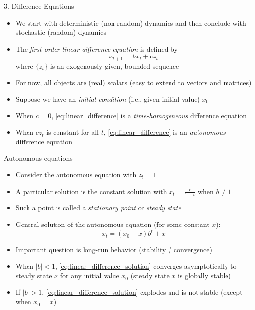\documentclass[10pt]{beamer}
\begin{document}
\begin{frame}{3. Difference Equations}
\begin{itemize}
\item We start with deterministic (non-random) dynamics and then conclude with stochastic (random) dynamics

\item The \textit{first-order linear difference equation} is defined by
\begin{equation}\label{eq:linear_difference}
	x_{t+1} = b x_t + c z_t 
\end{equation}
where $\{z_t\}$ is an exogenously given, bounded sequence

\item For now, all objects are (real) scalars (easy to extend to vectors and matrices)

\item Suppose we have an \textit{initial condition} (i.e., given initial value) $x_0$

\item When $c = 0$, \eqref{eq:linear_difference} is a \textit{time-homogeneous} difference equation

\item When $cz_t$ is constant for all $t$, \eqref{eq:linear_difference} is an \textit{autonomous} difference equation

\end{itemize}
\end{frame}


\begin{frame}{Autonomous equations}
\begin{itemize}
\item Consider the autonomous equation with $z_t = 1$ 

\item A particular solution is the constant solution with $x_t = \frac{c}{1-b}$ when $b \neq 1$

\item Such a point is called a \textit{stationary point} or \textit{steady state}

\item General solution of the autonomous equation (for some constant $x$):
\begin{equation}\label{eq:linear_difference_solution}
	x_t = (x_0 - x) b^t + x
\end{equation}

\item Important question is long-run behavior (stability / convergence)

\item When $| b | < 1$, \eqref{eq:linear_difference_solution} converges asymptotically to steady state $x$ for any initial value $x_0$ (steady state $x$ is globally stable) 

\item If $| b | > 1$, \eqref{eq:linear_difference_solution} explodes and is not stable (except when $x_0 = x$)
\end{itemize}
\end{frame}
\end{document}
